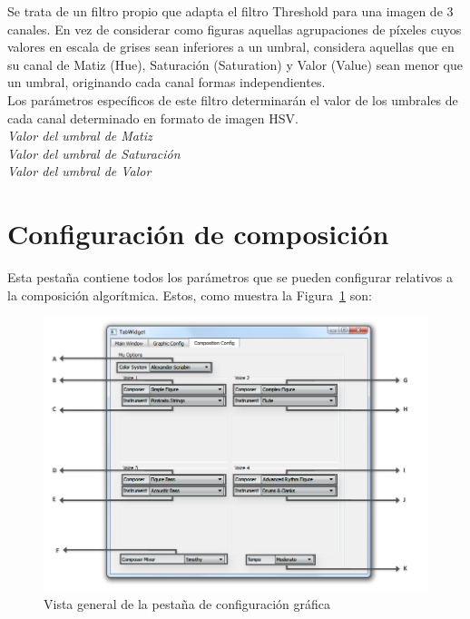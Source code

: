 		Se trata de un filtro propio que adapta el filtro Threshold para una imagen de 3 canales. En vez de considerar como figuras aquellas agrupaciones de píxeles cuyos valores en escala de grises sean inferiores a un umbral, considera aquellas que en su canal de Matiz (Hue), Saturación (Saturation) y Valor (Value) sean menor que un umbral, originando cada canal formas independientes.\\
		
		Los parámetros específicos de este filtro determinarán el valor de los umbrales de cada canal determinado en formato de imagen HSV.\\		
		
		\noindent\textit{Valor del umbral de Matiz}\\
		\noindent\textit{Valor del umbral de Saturación}\\
		\noindent\textit{Valor del umbral de Valor}




		
		\section{Configuración de composición}
		
		Esta pestaña contiene todos los parámetros que se pueden configurar relativos a la composición algorítmica. Estos, como muestra la Figura~\ref{fig:interfazcomp} son:\\
		
		\begin{figure}[htbp]
		\centering
		\hspace*{-0.9in}
		\includegraphics[scale=0.57]{graphics/interfazcomp.png}
		\caption{Vista general de la pestaña de configuración gráfica}
		\label{fig:interfazcomp}
		\end{figure}
		

